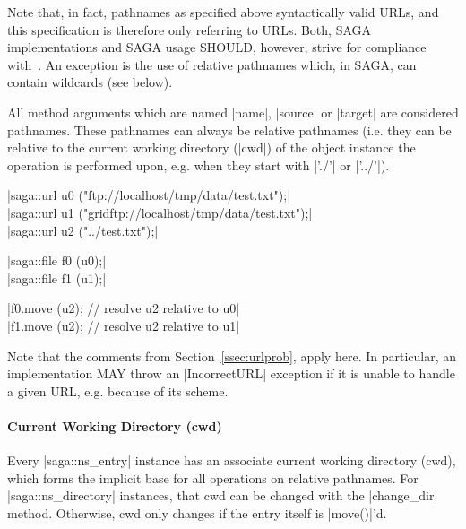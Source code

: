      Note that, in fact, pathnames as specified above 
     syntactically valid URLs, and this specification is
     therefore only referring to URLs.  Both, SAGA
     implementations and SAGA usage SHOULD, however, strive for
     compliance with~\cite{rns}.  An exception is the use of
     relative pathnames which, in SAGA, can contain wildcards
     (see below).
 
     All method arguments which are named |name|, |source| or
     |target| are considered pathnames.  These pathnames can
     always be relative pathnames (i.e. they can be relative to
     the current working directory (|cwd|) of the object
     instance the operation is performed upon, e.g. when they
     start with |'./'| or |'../'|).  



     \shift |saga::url u0 ("ftp://localhost/tmp/data/test.txt");|\\
     \shift |saga::url u1 ("gridftp://localhost/tmp/data/test.txt");|\\
     \shift |saga::url u2 ("../test.txt");|

     \shift |saga::file f0 (u0);|\\
     \shift |saga::file f1 (u1);|

     \shift |f0.move (u2);  // resolve u2 relative to u0|\\
     \shift |f1.move (u2);  // resolve u2 relative to u1|

     \XMark[9]
 
     Note that the comments from Section~\ref{ssec:urlprob},
     apply here.  In particular, an implementation MAY throw an
     |IncorrectURL| exception if it is unable to handle a given
     URL, e.g. because of its scheme.
 
 
   \paragraph{Current Working Directory (cwd)}
 
     Every |saga::ns_entry| instance has an associate current
     working directory (cwd), which forms the implicit base for
     all operations on relative pathnames.  For
     |saga::ns_directory| instances, that cwd can be changed
     with the |change_dir| method.  Otherwise, cwd only changes
     if the entry itself is |move()|'d.
 
